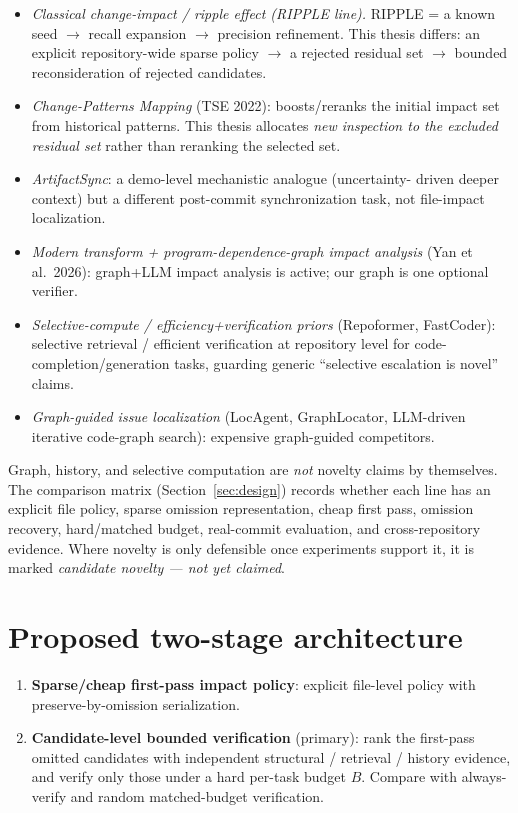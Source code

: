 \documentclass[11pt,a4paper]{article}
\begin{document}
\begin{itemize}
  \item \emph{Classical change-impact / ripple effect (RIPPLE line).} RIPPLE =
  a known seed $\rightarrow$ recall expansion $\rightarrow$ precision
  refinement. This thesis differs: an explicit repository-wide sparse policy
  $\rightarrow$ a rejected residual set $\rightarrow$ bounded reconsideration
  of rejected candidates.
  \item \emph{Change-Patterns Mapping} (TSE 2022): boosts/reranks the initial
  impact set from historical patterns. This thesis allocates \emph{new
  inspection to the excluded residual set} rather than reranking the selected
  set.
  \item \emph{ArtifactSync}: a demo-level mechanistic analogue (uncertainty-
  driven deeper context) but a different post-commit synchronization task, not
  file-impact localization.
  \item \emph{Modern transform + program-dependence-graph impact analysis}
  (Yan et al.\ 2026): graph+LLM impact analysis is active; our graph is one
  optional verifier.
  \item \emph{Selective-compute / efficiency+verification priors} (Repoformer,
  FastCoder): selective retrieval / efficient verification at repository level
  for code-completion/generation tasks, guarding generic ``selective escalation
  is novel'' claims.
  \item \emph{Graph-guided issue localization} (LocAgent, GraphLocator,
  LLM-driven iterative code-graph search): expensive graph-guided competitors.
\end{itemize}

Graph, history, and selective computation are \emph{not} novelty claims by
themselves. The comparison matrix (Section~\ref{sec:design}) records whether
each line has an explicit file policy, sparse omission representation, cheap
first pass, omission recovery, hard/matched budget, real-commit evaluation, and
cross-repository evidence. Where novelty is only defensible once experiments
support it, it is marked \emph{candidate novelty --- not yet claimed}.

\section{Proposed two-stage architecture}
\label{sec:architecture}

\begin{enumerate}
  \item \textbf{Sparse/cheap first-pass impact policy}: explicit file-level
        policy with preserve-by-omission serialization.
  \item \textbf{Candidate-level bounded verification} (primary): rank the
        first-pass omitted candidates with independent structural / retrieval /
        history evidence, and verify only those under a hard per-task budget
        $B$. Compare with always-verify and random matched-budget verification.
\end{enumerate}
\end{document}
